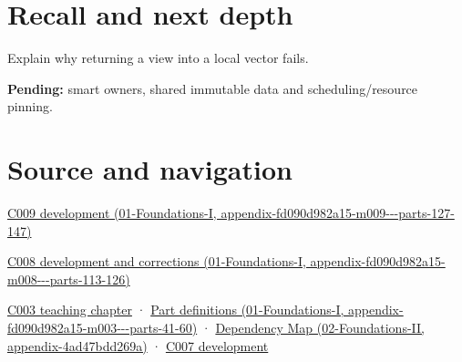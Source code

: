 \section{Recall and next depth}\label{appendix-d52e4486f527-recall-and-next-depth}

Explain why returning a view into a local vector fails.

\textbf{Pending:} smart owners, shared immutable data and scheduling/resource pinning.

\section{Source and navigation}\label{appendix-d52e4486f527-source-and-navigation}

\href{../01-Foundations-I/main.pdf\#nameddest=appendix-fd090d982a15-m009---parts-127-147}{C009 development (01-Foundations-I, appendix-fd090d982a15-m009-\/-\/-parts-127-147)}

\href{../01-Foundations-I/main.pdf\#nameddest=appendix-fd090d982a15-m008---parts-113-126}{C008 development and corrections (01-Foundations-I, appendix-fd090d982a15-m008-\/-\/-parts-113-126)}

\href{Continuous\%20Notes/Computing\%20Foundations\%20-\%20From\%20Bits\%20to\%20C++\%20and\%20Systems\%20APIs\#Where\%20the\%20bytes\%20live}{C003 teaching chapter} · \href{../01-Foundations-I/main.pdf\#nameddest=appendix-fd090d982a15-m003---parts-41-60}{Part definitions (01-Foundations-I, appendix-fd090d982a15-m003-\/-\/-parts-41-60)} · \href{../02-Foundations-II/main.pdf\#nameddest=appendix-4ad47bdd269a}{Dependency Map (02-Foundations-II, appendix-4ad47bdd269a)} · \href{Continuous\%20Notes/Computing\%20Foundations\%20-\%20From\%20Bits\%20to\%20C++\%20and\%20Systems\%20APIs\#Bringing\%20the\%20object\%20model\%20back\%20to\%20bytes}{C007 development}
